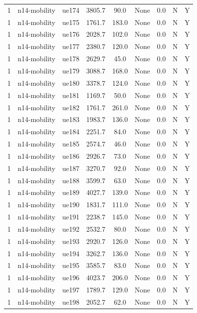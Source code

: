 \begin{table}[ht]
\begin{tabular}{|c|c|c|c|c|c|c|c|c|}
1 & n14-mobility & ue174 & 3805.7 & 90.0 & None & 0.0 & N & Y \\
1 & n14-mobility & ue175 & 1761.7 & 183.0 & None & 0.0 & N & Y \\
1 & n14-mobility & ue176 & 2028.7 & 102.0 & None & 0.0 & N & Y \\
1 & n14-mobility & ue177 & 2380.7 & 120.0 & None & 0.0 & N & Y \\
1 & n14-mobility & ue178 & 2629.7 & 45.0 & None & 0.0 & N & Y \\
1 & n14-mobility & ue179 & 3088.7 & 168.0 & None & 0.0 & N & Y \\
1 & n14-mobility & ue180 & 3378.7 & 124.0 & None & 0.0 & N & Y \\
1 & n14-mobility & ue181 & 1169.7 & 50.0 & None & 0.0 & N & Y \\
1 & n14-mobility & ue182 & 1761.7 & 261.0 & None & 0.0 & N & Y \\
1 & n14-mobility & ue183 & 1983.7 & 136.0 & None & 0.0 & N & Y \\
1 & n14-mobility & ue184 & 2251.7 & 84.0 & None & 0.0 & N & Y \\
1 & n14-mobility & ue185 & 2574.7 & 46.0 & None & 0.0 & N & Y \\
1 & n14-mobility & ue186 & 2926.7 & 73.0 & None & 0.0 & N & Y \\
1 & n14-mobility & ue187 & 3270.7 & 92.0 & None & 0.0 & N & Y \\
1 & n14-mobility & ue188 & 3599.7 & 63.0 & None & 0.0 & N & Y \\
1 & n14-mobility & ue189 & 4027.7 & 139.0 & None & 0.0 & N & Y \\
1 & n14-mobility & ue190 & 1831.7 & 111.0 & None & 0.0 & N & Y \\
1 & n14-mobility & ue191 & 2238.7 & 145.0 & None & 0.0 & N & Y \\
1 & n14-mobility & ue192 & 2532.7 & 80.0 & None & 0.0 & N & Y \\
1 & n14-mobility & ue193 & 2920.7 & 126.0 & None & 0.0 & N & Y \\
1 & n14-mobility & ue194 & 3262.7 & 136.0 & None & 0.0 & N & Y \\
1 & n14-mobility & ue195 & 3585.7 & 83.0 & None & 0.0 & N & Y \\
1 & n14-mobility & ue196 & 4023.7 & 206.0 & None & 0.0 & N & Y \\
1 & n14-mobility & ue197 & 1789.7 & 129.0 & None & 0.0 & N & Y \\
1 & n14-mobility & ue198 & 2052.7 & 62.0 & None & 0.0 & N & Y \\

\end{tabular}
\end{table}
